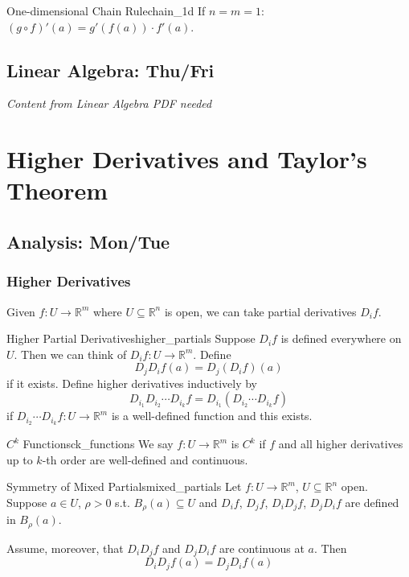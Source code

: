 \documentclass[11pt, letterpaper, openany]{book}
\begin{document}
\begin{thm}{One-dimensional Chain Rule}{chain_1d}
If $n = m = 1$: $(g \circ f)'(a) = g'(f(a)) \cdot f'(a)$.
\end{thm}

\section{Linear Algebra: Thu/Fri}
\begin{center}
    \textit{Content from Linear Algebra PDF needed}
\end{center}


\chapter{Higher Derivatives and Taylor's Theorem}

\section{Analysis: Mon/Tue}

\subsection{Higher Derivatives}

Given $f: U \to \mathbb{R}^m$ where $U \subseteq \mathbb{R}^n$ is open, we can take partial derivatives $D_i f$.

\begin{defn}{Higher Partial Derivatives}{higher_partials}
Suppose $D_i f$ is defined everywhere on $U$. Then we can think of $D_i f: U \to \mathbb{R}^m$. Define
\[D_j D_i f(a) = D_j(D_i f)(a)\]
if it exists. Define higher derivatives inductively by
\[D_{i_1} D_{i_2} \cdots D_{i_k} f = D_{i_1}(D_{i_2} \cdots D_{i_k} f)\]
if $D_{i_2} \cdots D_{i_k} f: U \to \mathbb{R}^m$ is a well-defined function and this exists.
\end{defn}

\begin{defn}{$C^k$ Functions}{ck_functions}
We say $f: U \to \mathbb{R}^m$ is $C^k$ if $f$ and all higher derivatives up to $k$-th order are well-defined and continuous.
\end{defn}

\begin{thm}{Symmetry of Mixed Partials}{mixed_partials}
Let $f: U \to \mathbb{R}^m$, $U \subseteq \mathbb{R}^n$ open. Suppose $a \in U$, $\rho > 0$ s.t. $B_\rho(a) \subseteq U$ and $D_i f$, $D_j f$, $D_i D_j f$, $D_j D_i f$ are defined in $B_\rho(a)$.

Assume, moreover, that $D_i D_j f$ and $D_j D_i f$ are continuous at $a$. Then
\[D_i D_j f(a) = D_j D_i f(a)\]
\end{thm}
\end{document}
